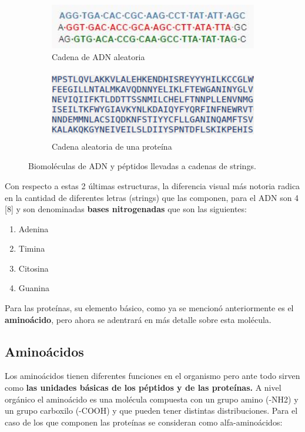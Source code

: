 \begin{figure}[H]

\begin{subfigure}{0.5\textwidth}
\includegraphics[width=1\linewidth, height=2cm]{./images/adnejemplo}
\caption{Cadena de ADN aleatoria}
\label{fig:subim4}
\end{subfigure}
\begin{subfigure}{0.4\textwidth}
\includegraphics[width=1\linewidth, height=3cm]{./images/cadenaproteina} 
\caption{Cadena aleatoria de una proteína}
\label{fig:subim3}
\end{subfigure}
 
\caption{Biomoléculas de ADN y péptidos llevadas a cadenas de strings.}
\label{fig:image2}
\end{figure}

Con respecto a estas 2 últimas estructuras, la diferencia visual más notoria radica en la cantidad de diferentes letras (strings) que las componen, para el ADN son 4 [8] y son denominadas \textbf{bases nitrogenadas} que son las siguientes:

\begin{enumerate}
\item Adenina
\item Timina
\item Citosina
\item Guanina
\end{enumerate}

Para las proteínas, su elemento básico, como ya se mencionó anteriormente es el \textbf{aminoácido}, pero ahora se adentrará en más detalle sobre esta molécula.

\subsection{Aminoácidos}

Los aminoácidos tienen diferentes funciones en el organismo \cite{amino} pero ante todo sirven como \textbf{las unidades básicas de los péptidos y de las proteínas.} A nivel orgánico el aminoácido es una molécula compuesta con un grupo amino (-NH2) y un grupo carboxilo (-COOH) y que pueden tener distintas distribuciones. Para el caso de los que componen las proteínas se consideran como alfa-aminoácidos:

